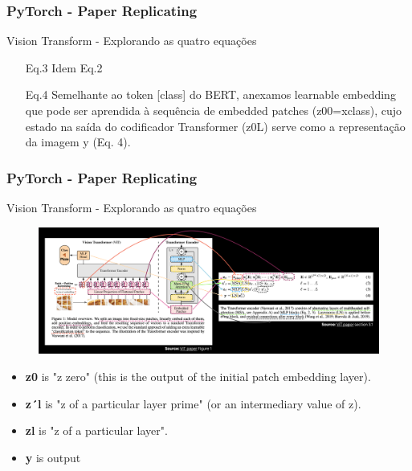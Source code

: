 \documentclass{beamer}
\begin{document}
\begin{frame}
	\frametitle{PyTorch - Paper Replicating}
	\begin{block}{Vision Transform - Explorando as quatro equações}
		\begin{itemize}
			\item[Eq.3] Idem Eq.2
			\item[Eq.4] Semelhante ao token [class] do BERT, anexamos learnable embedding que pode ser aprendida à sequência de embedded patches (z00=xclass), cujo estado na saída do codificador Transformer (z0L) serve como a representação da imagem y (Eq. 4).
		\end{itemize}
	\end{block}
\end{frame}
\begin{frame}
	\frametitle{PyTorch - Paper Replicating}
	\begin{block}{Vision Transform - Explorando as quatro equações}
		\begin{figure}
			\centering
			\includegraphics[width=1\linewidth]{figures/vit_fig1_eqs}
		\end{figure}
		\begin{itemize}
			\item \textbf{z0}  is "z zero" (this is the output of the initial patch embedding layer).
			\item \textbf{z´l } is "z of a particular layer prime" (or an intermediary value of z).
			\item \textbf{zl}  is "z of a particular layer".
			\item \textbf{y} is output
		\end{itemize}
	\end{block}
\end{frame}
\end{document}
